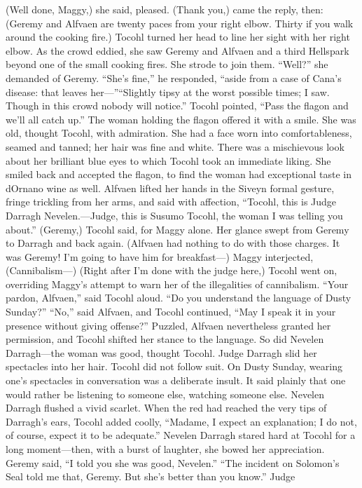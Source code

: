 \documentclass[9pt]{article}
\begin{document}
(Well done, Maggy,) she said, pleased.
(Thank you,) came the reply, then: (Geremy and Alfvaen are twenty paces from your right elbow.
Thirty if you walk around the cooking fire.)
Tocohl turned her head to line her sight with her right elbow. As the crowd eddied, she saw Geremy
and Alfvaen and a third Hellspark beyond one of the small cooking fires. She strode to join them.
“Well?” she demanded of Geremy.
“She’s fine,” he responded, “aside from a case of Cana’s disease: that leaves her—”“Slightly tipsy at the worst possible times; I saw. Though in this crowd nobody will notice.” Tocohl
pointed, “Pass the flagon and we’ll all catch up.”
The woman holding the flagon offered it with a smile.
She was old, thought Tocohl, with admiration. She had a face worn into comfortableness, seamed
and tanned; her hair was fine and white. There was a mischievous look about her brilliant blue eyes to
which Tocohl took an immediate liking. She smiled back and accepted the flagon, to find the woman had
exceptional taste in dOrnano wine as well.
Alfvaen lifted her hands in the Siveyn formal gesture, fringe trickling from her arms, and said with
affection, “Tocohl, this is Judge Darragh Nevelen.—Judge, this is Susumo Tocohl, the woman I was
telling you about.”
(Geremy,) Tocohl said, for Maggy alone. Her glance swept from Geremy to Darragh and back
again. (Alfvaen had nothing to do with those charges. It was Geremy! I’m going to have him for
breakfast—)
Maggy interjected, (Cannibalism—)
(Right after I’m done with the judge here,) Tocohl went on, overriding Maggy’s attempt to warn her
of the illegalities of cannibalism.
“Your pardon, Alfvaen,” said Tocohl aloud. “Do you understand the language of Dusty Sunday?”
“No,” said Alfvaen, and Tocohl continued, “May I speak it in your presence without giving offense?”
Puzzled, Alfvaen nevertheless granted her permission, and Tocohl shifted her stance to the language.
So did Nevelen Darragh—the woman was good, thought Tocohl.
Judge Darragh slid her spectacles into her hair. Tocohl did not follow suit. On Dusty Sunday, wearing
one’s spectacles in conversation was a deliberate insult. It said plainly that one would rather be listening
to someone else, watching someone else. Nevelen Darragh flushed a vivid scarlet.
When the red had reached the very tips of Darragh’s ears, Tocohl added coolly, “Madame, I expect
an explanation; I do not, of course, expect it to be adequate.”
Nevelen Darragh stared hard at Tocohl for a long moment—then, with a burst of laughter, she
bowed her appreciation.
Geremy said, “I told you she was good, Nevelen.”
“The incident on Solomon’s Seal told me that, Geremy. But she’s better than you know.” Judge
\end{document}
